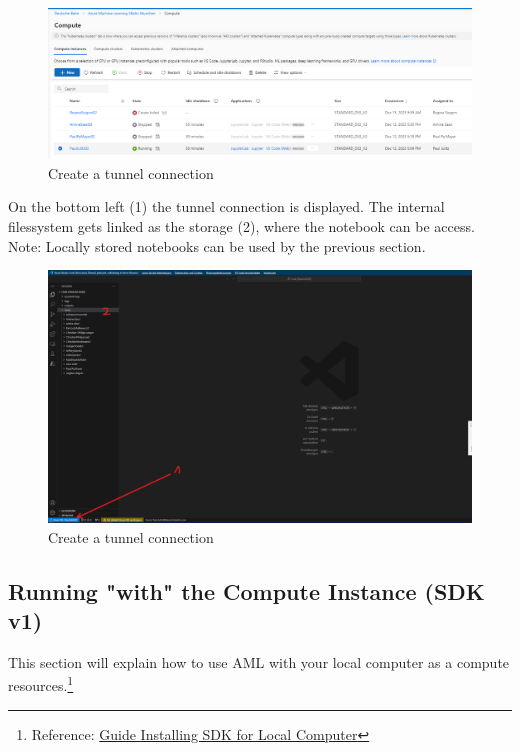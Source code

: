 \begin{figure}[H]
	\centering
	\includegraphics[scale = 0.3]{attachment/chapter_AML/Scc022}
	\caption{Create a tunnel connection}
\end{figure}

On the bottom left (1) the tunnel connection is displayed. The internal filessystem gets linked as the storage (2), where the notebook can be access. Note: Locally stored notebooks can be used by the previous section.

\begin{figure}[H]
	\centering
	\includegraphics[scale = 0.3]{attachment/chapter_AML/Scc021}
	\caption{Create a tunnel connection}
\end{figure}


\subsection{Running "with" the Compute Instance (SDK v1)}

This section will explain how to use \gls{AML} with your local computer as a compute resources.\footnote{
Reference:  \href{https://learn.microsoft.com/en-us/azure/machine-learning/how-to-configure-environment?view=azureml-api-2#local-computer-or-remote-vm-environment}{Guide Installing SDK for Local Computer}
}\\


